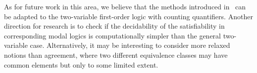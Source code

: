 As for future work in this area, we believe that the methods introduced
in~ can be adapted to the two-variable first-order logic with
counting quantifiers.
Another direction for research is to check if the decidability of the
satisfiability in corresponding modal logics is computationally simpler than the
general two-variable case.
Alternatively, it may be interesting to consider more relaxed notions than
agreement, where two different equivalence classes may have common elements but
only to some limited extent.
